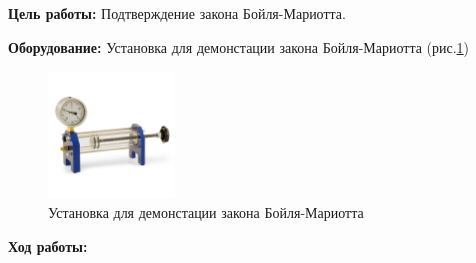 \textbf{Цель работы:} Подтверждение закона Бойля-Мариотта.

\textbf{Оборудование:} Установка для демонстации закона Бойля-Мариотта (рис.\ref{fig:установка для демнострации закона Бойля-Мариотта})

\begin{figure}[!h]
    \centering
    \includegraphics[width = 0.3\textwidth]{image/image2.png}
    
    \caption{Установка для демонстации закона Бойля-Мариотта}
    
    \label{fig:установка для демнострации закона Бойля-Мариотта}
\end{figure}

\textbf{Ход работы:}

